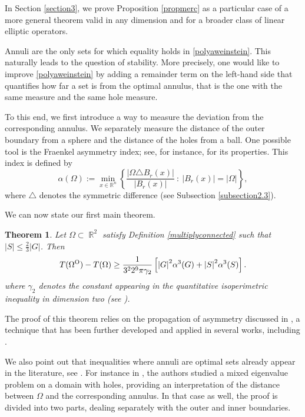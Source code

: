 \documentclass[oneside,a4paper,11pt,notitlepage]{article}
\newcommand{\abs}[1]{{\left|#1\right|}}
\theoremstyle{definition}
\theoremstyle{plain}
\newtheorem{theorem}{Theorem}[section]
\theoremstyle{definition}
\DeclareMathOperator{\R}{\mathbb{R}}
\newcommand{\OO}{\text{\normalfont  O}}
\begin{document}
In Section \ref{section3}, we prove Proposition \ref{propmerc} as a particular case of a more general theorem valid in any dimension and for a broader class of linear elliptic operators.

Annuli are the only sets for which equality holds in \eqref{polyaweinstein}. This naturally leads to the question of stability.  More precisely, one would like to improve \eqref{polyaweinstein} by adding a remainder term on the left-hand side that quantifies how far a set is from the optimal annulus, that is the one with the same measure and the same hole measure.

To this end, we first introduce a way to measure the deviation from the corresponding annulus. We separately measure the distance of the outer boundary from a sphere and the distance of the holes from a ball. One possible tool is the Fraenkel asymmetry index; see, for instance, \cite{F} for its properties. This index is defined by
\begin{equation*}
	\alpha(\Omega) := \min_{x \in \mathbb{R}^{n}} \left\{ \frac{|\Omega \triangle B_r(x)|}{|B_r(x)|} \ : \ |B_r(x)| = |\Omega| \right\},
\end{equation*}
where $\triangle$ denotes the symmetric difference (see Subsection \ref{subsection2.3}).

We can now state our first main theorem.

\begin{theorem}\label{thm:dueasimmetrie}
     Let $\Omega\subset\R^2$ satisfy Definition \ref{multiplyconnected} such that $\displaystyle{\abs{S}\leq\frac{2}{3}\abs{G}}$. Then %
    \begin{equation*}
        T(\Omega^\OO)-T(\Omega)\geq \frac{1}{3^22^{9} \pi \gamma_2}\left[\abs{G}^2  \alpha^3(G)+\abs{S}^2\alpha^3(S)\right].
     \end{equation*}
    where $\gamma_2$ denotes the constant appearing in the quantitative isoperimetric inequality in dimension two (see \cite{FMP2}).
\end{theorem}

The proof of this theorem relies on the propagation of asymmetry discussed in \cite{HN}, a technique that has been further developed and applied in several works, including \cite{AB,ABMP,ABCMP,BD,CLI,MS}.

We also point out that inequalities where annuli are optimal sets already appear in the literature, see \cite{Simon,CPP,GPPS,PPS,PPT}. For instance in \cite{CPP}, the authors studied a mixed eigenvalue problem on a domain with holes, providing an interpretation of the distance between $\Omega$ and the corresponding annulus. In that case as well, the proof is divided into two parts, dealing separately with the outer and inner boundaries.
\end{document}
